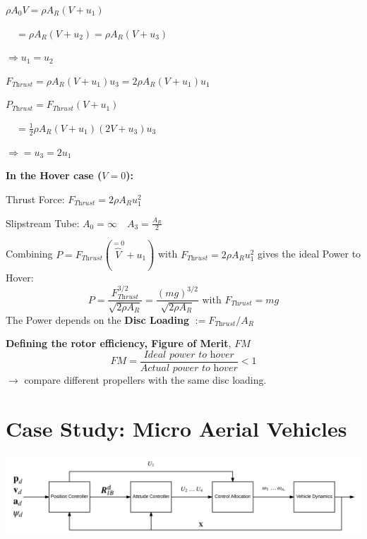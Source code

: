 \documentclass[fontsize=6pt,DIV=calc,a4paper,ngerman]{scrartcl}
\begin{document}
\begin{multicols*}{4}
\begin{minipage}{0.6\linewidth}
		$\rho A_0 V = \rho A_R (V+u_1)$

		$\quad = \rho A_R (V+u_2)= \rho A_R (V+u_3)$

		$\Rightarrow u_1=u_2$

		\smallskip
		$F_{\textit{Thrust}} 
		= \rho A_R(V+u_1)u_3
		= 2\rho A_R(V+u_1)u_1 $

		$P_{\textit{Thrust}} = F_{\textit{Thrust}}(V+u_1) $

		$\quad= \frac{1}{2}\rho A_R(V+u_1)(2V+u_3)u_3$

		$\Rightarrow = u_3 = 2u_1$

		\smallskip
		\textbf{In the Hover case ($V=0$):}

		Thrust Force: $F_{\textit{Thrust}} = 2\rho A_Ru_1^2$

		Slipstream Tube: $A_0 = \infty \quad A_3 = \frac{A_R}{2}$
	\end{minipage}

	Combining $P=F_{\textit{Thrust}}(\overbrace{V}^{=0}+u_1)$ with $F_{\textit{Thrust}}=2\rho A_Ru_1^2$ gives the ideal Power to Hover:
	$$P=\frac{F_{\textit{Thrust}}^{3/2}}{\sqrt{2\rho A_R}} = \frac{(mg)^{3/2}}{\sqrt{2\rho A_R}} \text{ with } F_{\textit{Thrust}} = mg$$
	The Power depends on the \textbf{Disc Loading} $:=F_{\textit{Thrust}}/A_R$

	\smallskip
	\textbf{Defining the rotor efficiency, Figure of Merit}, $FM$\\
	$$FM = \frac{\textit{Ideal power to hover}}{\textit{Actual power to hover}}<1$$
	$\rightarrow$ compare different propellers with the same disc loading.

	\section{Case Study: Micro Aerial Vehicles}
	\includegraphics[width = \linewidth]{CaseControlArch.png}

\end{multicols*}
\end{document}
